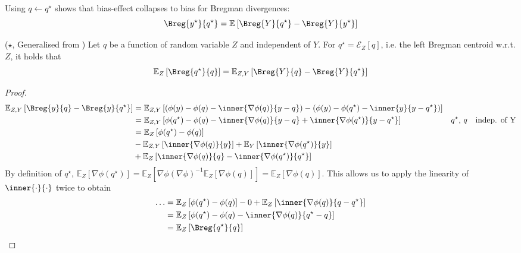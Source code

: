 \documentclass[../main.tex]{subfiles}
\begin{document}
Using $q \gets q^\star$ shows that bias-effect collapses to bias for Bregman divergences: 
$$\Breg{y^\star}{q^\star} = \mathbb{E}_{}\left[ \Breg{Y}{q^\star} - \Breg{Y}{y^\star} \right]$$

\begin{lemma} \label{thm:bregman-collapse-variances} ($\star$, Generalised from \cite{ref:wood23})
Let $q$ be a function of random variable $Z$ and independent of $Y$. For $q^\star = \mathcal{E}_{Z}\left[ q \right]$, i.e. the left Bregman centroid w.r.t. $Z$, it holds that
$$
\mathbb{E}_{Z}\left[ \Breg{q^\star}{q} \right] 
 = \mathbb{E}_{Z,Y}\left[ \Breg{Y}{q} - \Breg{Y}{q^\star} \right] 
$$
\end{lemma}
\begin{proof}
\begin{align*}
    \mathbb{E}_{Z,Y}\left[ \Breg{y}{q} - \Breg{y}{q^\star} \right]  
    &= \mathbb{E}_{Z,Y}\left[ (\phi(y) - \phi(q) - \inner{\nabla \phi(q)}{y-q}) - (\phi(y) - \phi(q^\star) - \inner{y}{y - q^\star}) \right]  \\
    &= \mathbb{E}_{Z,Y}\left[ \phi(q^\star) - \phi(q) - \inner{\nabla \phi(q)}{y-q} + \inner{\nabla \phi(q^\star)}{y-q^\star}\right]  & \text{$q^\star$, $q$ ~~indep. of Y} \\ 
    &= \mathbb{E}_{Z}\left[  \phi(q^\star) - \phi(q) \right]  \\
    &- \mathbb{E}_{Z,Y}\left[ \inner{\nabla \phi(q)}{y}\right]  + \mathbb{E}_{Y}\left[ \inner{\nabla \phi(q^\star)}{y} \right] \\
    &+ \mathbb{E}_{Z}\left[ \inner{\nabla \phi(q)}{q} - \inner{\nabla \phi(q^\star)}{q^\star} \right] 
\end{align*}
By definition of $q^\star$, $\mathbb{E}_{Z}\left[ \nabla \phi(q^\star) \right] = \mathbb{E}_{Z}\left[ \nabla \phi (\nabla \phi)^{-1} \mathbb{E}_{Z}\left[ \nabla \phi(q) \right] \right] = \mathbb{E}_{Z}\left[ \nabla \phi(q) \right]$. This allows us to apply the linearity of $\inner{\cdot}{\cdot}$ twice to obtain
\begin{align*}
    \dots &= \mathbb{E}_{Z}\left[ \phi(q^\star) - \phi(q) \right]  - 0 + \mathbb{E}_{Z}\left[ \inner{\nabla \phi(q)}{q-q^\star} \right]  \\
    &= \mathbb{E}_{Z}\left[ \phi(q^\star) - \phi(q)  - \inner{\nabla \phi(q)}{q^\star - q}\right]  \\
    &= \mathbb{E}_{Z}\left[ \Breg{q^\star}{q} \right] 
\end{align*}
\end{proof}
\end{document}
